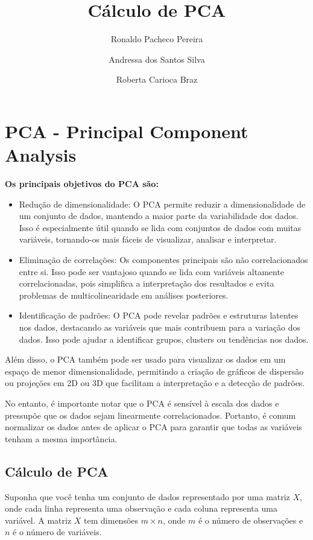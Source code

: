 \documentclass[12pt, a4paper]{article}
\title{Cálculo de PCA}
\author{Ronaldo Pacheco Pereira
\and Andressa dos Santos Silva
\and Roberta Carioca Braz}
\begin{document}
\maketitle

\section{PCA - Principal Component Analysis}


\textbf{Os principais objetivos do PCA são:}\\
\begin{itemize}
\item Redução de dimensionalidade: O PCA permite reduzir a dimensionalidade de um conjunto de dados, mantendo a maior parte da variabilidade dos dados. Isso é especialmente útil quando se lida com conjuntos de dados com muitas variáveis, tornando-os mais fáceis de visualizar, analisar e interpretar.

\item Eliminação de correlações: Os componentes principais são não correlacionados entre si. Isso pode ser vantajoso quando se lida com variáveis altamente correlacionadas, pois simplifica a interpretação dos resultados e evita problemas de multicolinearidade em análises posteriores.

\item Identificação de padrões: O PCA pode revelar padrões e estruturas latentes nos dados, destacando as variáveis que mais contribuem para a variação dos dados. Isso pode ajudar a identificar grupos, clusters ou tendências nos dados.
\end{itemize}
Além disso, o PCA também pode ser usado para visualizar os dados em um espaço de menor dimensionalidade, permitindo a criação de gráficos de dispersão ou projeções em 2D ou 3D que facilitam a interpretação e a detecção de padrões.

No entanto, é importante notar que o PCA é sensível à escala dos dados e pressupõe que os dados sejam linearmente correlacionados. Portanto, é comum normalizar os dados antes de aplicar o PCA para garantir que todas as variáveis tenham a mesma importância.

\subsection{Cálculo de PCA}

Suponha que você tenha um conjunto de dados representado por uma matriz $X$, onde cada linha representa uma observação e cada coluna representa uma variável. A matriz $X$ tem dimensões $m \times n$, onde $m$ é o número de observações e $n$ é o número de variáveis.
\end{document}
